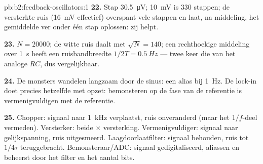 \begin{solution}{pb:b2:feedback-oscillators:1}
\textbf{22.} Stap \qty{30.5}{\micro V}; \qty{10}{mV} is $330$ stappen; de
versterkte ruis (\qty{16}{mV} effectief) overspant vele stappen en laat, na
middeling, het gemiddelde ver onder één stap oplossen: zij helpt.

\textbf{23.} $N = 20000$; de witte ruis daalt met $\sqrt N = 140$; een
rechthoekige middeling over \qty{1}{s} heeft een ruisbandbreedte
$1/2T = \qty{0.5}{Hz}$ --- twee keer die van het analoge $RC$, dus
vergelijkbaar.

\textbf{24.} De monsters wandelen langzaam door de sinus: een alias bij
\qty{1}{Hz}. De lock-in doet precies hetzelfde met opzet: bemonsteren op de
fase van de referentie is vermenigvuldigen met de referentie.

\textbf{25.} Chopper: signaal naar \qty{1}{kHz} verplaatst, ruis onveranderd
(maar het $1/f$-deel vermeden). Versterker: beide $\times$ versterking.
Vermenigvuldiger: signaal naar gelijkspanning, ruis uitgesmeerd.
Laagdoorlaatfilter: signaal behouden, ruis tot $1/4\tau$ teruggebracht.
Bemonsteraar/ADC: signaal gedigitaliseerd, aliassen en  beheerst
door het filter en het aantal bits.
\end{solution}
